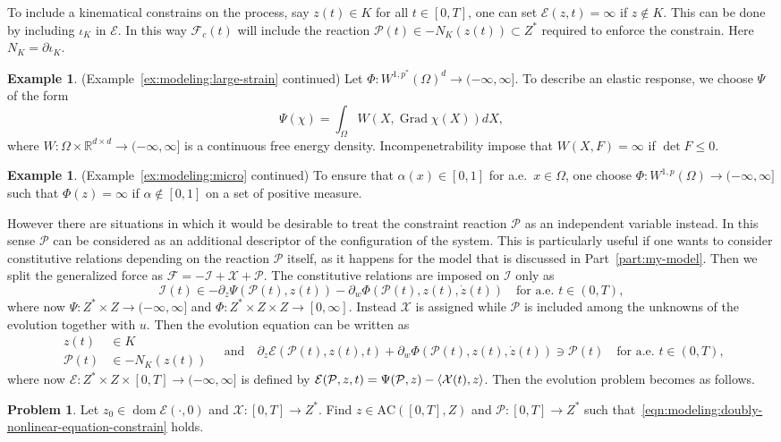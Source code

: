 \documentclass[a4paper,10pt,twoside]{amsbook}
\numberwithin{section}{chapter}
\numberwithin{equation}{chapter}
\theoremstyle{definition}
\newtheorem{ex}[prop]{Example}
\newtheorem{prb}[prop]{Problem}
\DeclareMathOperator{\dom}{dom}
\DeclareMathOperator{\Grad}{Grad}
\DeclarePairedDelimiter{\dual}{\langle}{\rangle}
\begin{document}
To include a kinematical constrains on the process, say $z(t)\in K$ for all $t\in[0,T]$, one can set $\mathcal{E}(z,t)=\infty$ if $z\notin K$. This can be done by including $\iota_K$ in $\mathcal{E}$. In this way $\mathcal{F}_c(t)$ will include the reaction $\mathcal{P}(t)\in-N_K(z(t))\subset Z^*$ required to enforce the constrain. Here $N_K=\partial\iota_K$.
\begin{ex}(Example~\ref{ex:modeling:large-strain} continued)
Let $\Phi\colon W^{1,p^*}(\Omega)^d\to(-\infty,\infty]$. To describe an elastic response, we choose $\Psi$ of the form
\[
\Psi(\chi)=\int_\Omega W(X,\Grad\chi(X))dX,
\]
where $W\colon\Omega\times\mathbb{R}^{d\times d}\to(-\infty,\infty]$ is a continuous free energy density. Incompenetrability impose that $W(X,F)=\infty$ if $\det F\le0$.
\end{ex}
\begin{ex}(Example~\ref{ex:modeling:micro} continued)
To ensure that $\alpha(x)\in[0,1]$ for a.e.\ $x\in\Omega$, one choose $\Phi\colon W^{1,p}(\Omega)\to(-\infty,\infty]$ such that $\Phi(z)=\infty$ if $\alpha\notin[0,1]$ on a set of positive measure.
\end{ex}
However there are situations in which it would be desirable to treat the constraint reaction $\mathcal{P}$ as an independent variable instead. In this sense $\mathcal{P}$ can be considered as an additional descriptor of the configuration of the system. This is particularly useful if one wants to consider constitutive relations depending on the reaction $\mathcal{P}$ itself, as it happens for the model that is discussed in Part~\ref{part:my-model}. Then we split the generalized force as $\mathcal{F}=-\mathcal{I}+\mathcal{X}+\mathcal{P}$. The constitutive relations are imposed on $\mathcal{I}$ only as
\[
\mathcal{I}(t)\in-\partial_z\Psi(\mathcal{P}(t),z(t))-\partial_w\Phi(\mathcal{P}(t),z(t),\dot z(t))\quad\text{for a.e.\ $t\in(0,T)$},
\]
where now $\Psi\colon Z^*\times Z\to(-\infty,\infty]$ and $\Phi\colon Z^*\times Z\times Z\to[0,\infty]$. Instead
$\mathcal{X}$ is assigned while $\mathcal{P}$ is included among the unknowns of the evolution together with $u$. Then the evolution equation can be written as
\begin{equation}
\label{eqn:modeling:doubly-nonlinear-equation-constrain}
\begin{split}
z(t)&\in K\\
\mathcal{P}(t)&\in-N_K(z(t))
\end{split}
\quad\text{and}\quad\partial_z\mathcal{E}(\mathcal{P}(t),z(t),t)+\partial_w\Phi(\mathcal{P}(t),z(t),\dot z(t))\ni\mathcal{P}(t)\quad\text{for a.e.\ $t\in(0,T)$},
\end{equation}
where now $\mathcal{E}\colon Z^*\times Z\times[0,T]\to(-\infty,\infty]$ is defined by $\mathcal{E}(\mathcal{P},z,t)=\Psi(\mathcal{P},z)-\dual{\mathcal{X}(t),z}$. Then the evolution problem becomes as follows.
\begin{prb}
\label{prb:constrained}
Let $z_0\in\dom\mathcal{E}(\cdot,0)$ and $\mathcal{X}\colon[0,T]\to Z^*$. Find $z\in\text{AC}([0,T],Z)$ and $\mathcal{P}\colon[0,T]\to Z^*$ such that~\eqref{eqn:modeling:doubly-nonlinear-equation-constrain} holds.
\end{prb}
\end{document}
